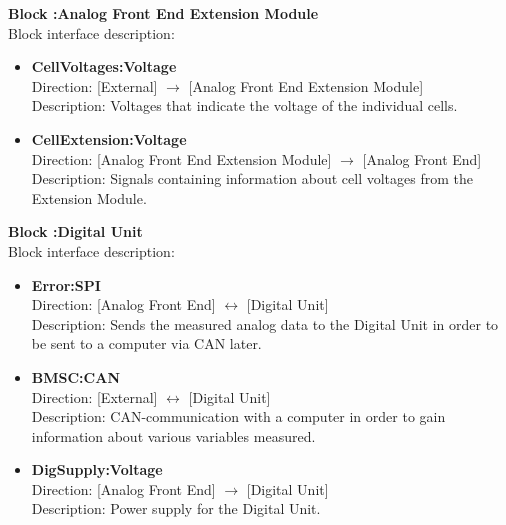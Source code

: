 \textbf{Block :Analog Front End Extension Module}\\
Block interface description:
\begin{itemize}
	\item \textbf{CellVoltages:Voltage}\\
	Direction: [External] $\rightarrow$ [Analog Front End Extension Module]\\
	Description: Voltages that indicate the voltage of the individual cells.
	\item \textbf{CellExtension:Voltage}\\
	Direction: [Analog Front End Extension Module] $\rightarrow$ [Analog Front End]\\
	Description: Signals containing information about cell voltages from the Extension Module. 
\end{itemize}

\textbf{Block :Digital Unit}\\
Block interface description:
\begin{itemize}
	\item \textbf{Error:SPI}\\
	Direction: [Analog Front End] $\leftrightarrow$ [Digital Unit]\\
	Description: Sends the measured analog data to the Digital Unit in order to be sent to a computer via CAN later.
	\item \textbf{BMSC:CAN}\\
	Direction: [External] $\leftrightarrow$ [Digital Unit]\\
	Description: CAN-communication with a computer in order to gain information about various variables measured.
	\item \textbf{DigSupply:Voltage}\\
	Direction: [Analog Front End] $\rightarrow$ [Digital Unit]\\
	Description: Power supply for the Digital Unit.
\end{itemize}

